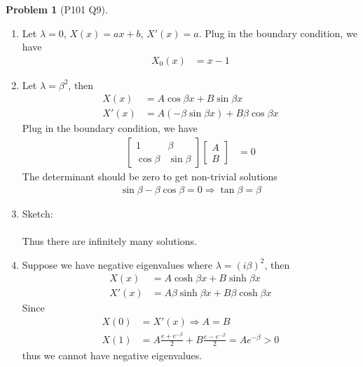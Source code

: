 \documentclass[twoside,11pt]{article}
\theoremstyle{definition}
\newtheorem{problem}{Problem}
\theoremstyle{remark}
\begin{document}
\begin{problem}[P101 Q9]\
\begin{enumerate}[label=(\alph*)]
    \item Let $\lambda=0$, $X(x)=ax+b$, $X'(x)=a$.
    Plug in the boundary condition, we have
    \begin{align*}
        X_0(x) &= x - 1
    \end{align*}
    \item Let $\lambda=\beta^2$, then 
    \begin{align*}
        X(x) &= A\cos\beta x + B\sin\beta x\\
        X'(x) &= A(-\beta\sin\beta x) + B\beta\cos\beta x
    \end{align*}
    Plug in the boundary condition, we have
    \begin{align*}
        \begin{bmatrix}
            1 & \beta \\
            \cos\beta & \sin\beta
        \end{bmatrix}
        \begin{bmatrix}
            A\\B
        \end{bmatrix} &= 0
    \end{align*}
    The determinant should be zero to get non-trivial solutions
    \begin{align*}
        \sin\beta -\beta\cos\beta = 0\Rightarrow
        \tan\beta = \beta
    \end{align*}

    \item Sketch:\\
    \\
    Thus there are infinitely many solutions.

    \item Suppose we have negative eigenvalues where $\lambda=(i\beta)^2$, then
    \begin{align*}
        X(x) &= A\cosh\beta x + B\sinh\beta x\\
        X'(x) &= A\beta\sinh\beta x + B\beta\cosh\beta x
    \end{align*}
    Since
    \begin{align*}
        X(0) &= X'(x) \Rightarrow A = B\\
        X(1) &= A\frac{e+e^{-\beta}}{2} + B\frac{e-e^{-\beta}}{2}
        = Ae^{-\beta} > 0
    \end{align*}
    thus we cannot have negative eigenvalues.
\end{enumerate}
\end{problem}
\end{document}
